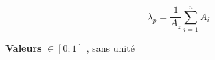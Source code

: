 \documentclass[[a4paper, 11pt]{article}
\begin{document}
\begin{equation}
	\lambda_p =  \frac{1}{A_z} \sum_{i=1}^n A_i
\end{equation}

\textbf{Valeurs} $\in [0;1]$ , sans unité




%
%
%
% 


\end{document}

